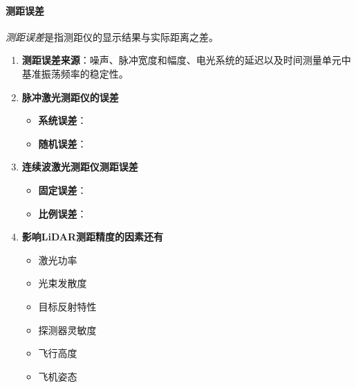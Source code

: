 \paragraph{测距误差}\textit{测距误差}是指测距仪的显示结果与实际距离之差。
\begin{enumerate}
	\item \textbf{测距误差来源}：噪声、脉冲宽度和幅度、电光系统的延迟以及时间测量单元中基准振荡频率的稳定性。
	\item \textbf{脉冲激光测距仪的误差}
		\begin{itemize}
			\item \textbf{系统误差}：
			\item \textbf{随机误差}：
		\end{itemize} %
	\item \textbf{连续波激光测距仪测距误差}
		\begin{itemize}
			\item \textbf{固定误差}：
			\item \textbf{比例误差}：
		\end{itemize} %
	\item \textbf{影响LiDAR测距精度的因素还有}
		\begin{itemize}
			\item 激光功率
			\item 光束发散度
			\item 目标反射特性
			\item 探测器灵敏度
			\item 飞行高度
			\item 飞机姿态
		\end{itemize} %
\end{enumerate} %

